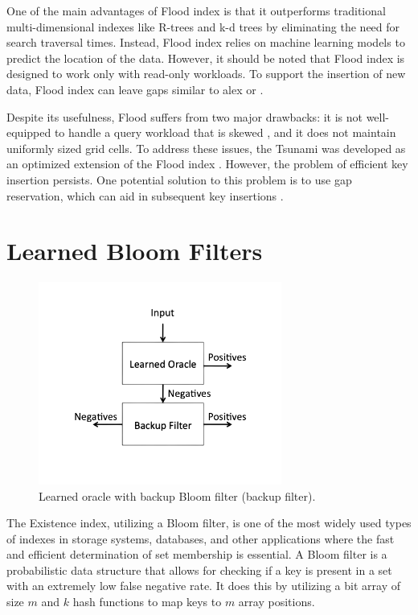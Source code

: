 One of the main advantages of Flood index is that it outperforms traditional multi-dimensional indexes like R-trees and k-d trees by eliminating the need for search traversal times. Instead, Flood index relies on machine learning models to predict the location of the data. However, it should be noted that Flood index is designed to work only with read-only workloads. To support the insertion of new data, Flood index can leave gaps similar to \acrshort{alex} or \btree. 

Despite its usefulness, Flood suffers from two major drawbacks: it is not well-equipped to handle a query workload that is skewed \cite{Tsunami}, and it does not maintain uniformly sized grid cells. To address these issues, the Tsunami was developed as an optimized extension of the Flood index \cite{Tsunami}. However, the problem of efficient key insertion persists. One potential solution to this problem is to use gap reservation, which can aid in subsequent key insertions \cite{FloodLMD}.



\section{Learned Bloom Filters}
\begin{figure}
    \centering
    \includegraphics[width=80mm,scale=1]{Figures/learnedBloom.png}
    \caption{
        Learned oracle with backup Bloom filter (backup filter).
    }
    \label{fig:LearnedBloom}
\end{figure}
The Existence index, utilizing a Bloom filter, is one of the most widely used types of indexes in storage systems, databases, and other applications where the fast and efficient determination of set membership is essential. A Bloom filter is a probabilistic data structure that allows for checking if a key is present in a set with an extremely low false negative rate. It does this by utilizing a bit array of size $m$ and $k$ hash functions to map keys to $m$ array positions.

